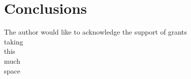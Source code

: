 \documentclass[sigconf]{acmart}
\begin{document}
\section{Conclusions}
\label{sec:con}





\begin{acks}

  The author would like to acknowledge the support of grants\\
  taking\\
  this\\
  much\\
  space\\

\end{acks}




\end{document}
